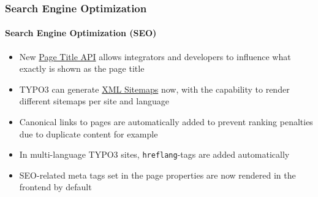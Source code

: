 \begin{frame}[fragile]
	\frametitle{Search Engine Optimization}
	\framesubtitle{Search Engine Optimization (SEO)}

	\begin{itemize}
		\item New
			\href{https://docs.typo3.org/typo3cms/CoreApiReference/ApiOverview/PageTitleApi/Index.html}{Page Title API}
			allows integrators and developers to influence what exactly is shown
			as the page title
		\item TYPO3 can generate
			\href{https://docs.typo3.org/typo3cms/CoreApiReference/ApiOverview/XmlSitemap/Index.html}{XML Sitemaps}
			now, with the capability to render different sitemaps per site and
			language
		\item Canonical links to pages are automatically added to prevent
			ranking penalties due to duplicate content for example
		\item In multi-language TYPO3 sites, \texttt{hreflang}-tags are added
			automatically
		\item SEO-related meta tags set in the page properties are now rendered
			in the frontend by default

	\end{itemize}

\end{frame}


